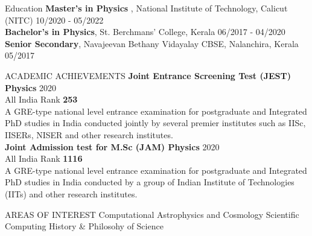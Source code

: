 \documentclass{resume} %
\begin{document}
\begin{rSection}{Education}
{\bf Master's in Physics }, National Institute of Technology, Calicut (NITC) \hfill {10/2020 - 05/2022} \\
{\bf Bachelor’s in Physics}, St. Berchmans’ College, Kerala \hfill {06/2017 - 04/2020}\\
{\bf Senior Secondary}, Navajeevan Bethany Vidayalay CBSE, Nalanchira, Kerala \hfill {05/2017}
\end{rSection}

\begin{rSection}{ACADEMIC ACHIEVEMENTS}
\textbf{Joint Entrance Screening Test (JEST) Physics}  \hfill 2020 
\\ All India Rank \textbf{253}
\\A GRE-type national level entrance examination for postgraduate and Integrated PhD studies
in India conducted jointly by several premier institutes such as IISc, IISERs, NISER and other research institutes.
\\ \textbf{Joint Admission test for M.Sc (JAM) Physics }  \hfill 2020
\\ All India Rank \textbf{1116}
\\A GRE-type national level entrance examination for postgraduate and Integrated PhD studies
in India conducted by a group of Indian Institute of Technologies (IITs)
and other research institutes.

\end{rSection}

\begin{rSection}{AREAS OF INTEREST }
Computational Astrophysics and Cosmology \textbar{} \iffalse Computational Physics  \textbar{} \fi  Scientific Computing \textbar{}  History \& Philosohy of Science
\end{rSection}
\end{document}
